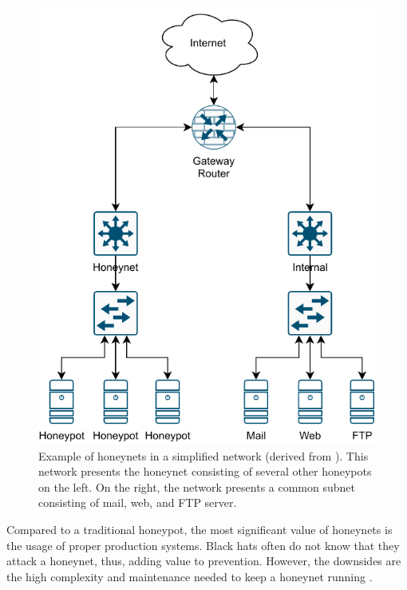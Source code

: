 \begin{figure}
    \centering
    \includegraphics{figures/honeynet-example.pdf}
    \caption[Example of honeynets in a simplified network]{
        Example of honeynets in a simplified network (derived from \cite{Spitzner2003}).
        This network presents the honeynet consisting of several other honeypots on the left.
        On the right, the network presents a common subnet consisting of mail, web, and FTP server.
    }
    \label{fig:honeynet-example}
\end{figure}

Compared to a traditional honeypot, the most significant value of honeynets is the usage of proper production systems.
Black hats often do not know that they attack a honeynet, thus, adding value to prevention.
However, the downsides are the high complexity and maintenance needed to keep a honeynet running \cite{Spitzner2003}.

